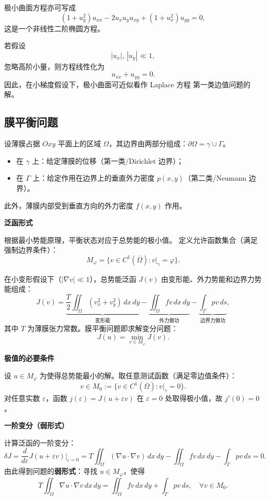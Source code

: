 \documentclass[12pt,a4paper]{ctexart}
\begin{document}
	极小曲面方程亦可写成
	\[
	(1+u_y^2)u_{xx}-2u_xu_yu_{xy}+(1+u_x^2)u_{yy}=0,
	\]
	这是一个非线性二阶椭圆方程。
	
	若假设
	\[
	|u_x|,\,|u_y|\ll1,
	\]
	忽略高阶小量，则方程线性化为
	\[
	u_{xx}+u_{yy}=0.
	\]
	因此，在小梯度假设下，极小曲面可近似看作 Laplace 方程
	第一类边值问题的解。
	
	\subsection{膜平衡问题}
	
	设薄膜占据 $Oxy$ 平面上的区域 $\Omega$，其边界由两部分组成：$\partial\Omega = \gamma \cup \Gamma$。
	
	\begin{itemize}
		\item 在 $\gamma$ 上：给定薄膜的位移（第一类/Dirichlet 边界）；
		\item 在 $\Gamma$ 上：给定作用在边界上的垂直外力密度 $p(x,y)$（第二类/Neumann 边界）。
	\end{itemize}
	此外，薄膜内部受到垂直方向的外力密度 $f(x,y)$ 作用。
	
	\medskip
	\textbf{泛函形式}
	
	根据最小势能原理，平衡状态对应于总势能的极小值。
	定义允许函数集合（满足强制边界条件）：
	\[
	M_\varphi = \{ v \in C^1(\overline{\Omega}) : v|_\gamma = \varphi \}.
	\]
	
	在小变形假设下（$|\nabla v| \ll 1$），总势能泛函 $J(v)$ 由变形能、外力势能和边界力势能组成：
	\[
	J(v) = \underbrace{\frac{T}{2} \iint_{\Omega} (v_x^2 + v_y^2) \,dx\,dy}_{\text{变形能}} 
	- \underbrace{\iint_{\Omega} f v \,dx\,dy}_{\text{外力做功}} 
	- \underbrace{\int_{\Gamma} p v \,ds}_{\text{边界力做功}},
	\]
	其中 $T$ 为薄膜张力常数。膜平衡问题即求解变分问题：
	\[
	J(u) = \min_{v \in M_\varphi} J(v).
	\]
	
	\medskip
	\textbf{极值的必要条件}
	
	设 $u \in M_\varphi$ 为使得总势能最小的解。取任意测试函数（满足零边值条件）：
	\[
	v \in M_0 := \{ v \in C^1(\overline{\Omega}) : v|_\gamma = 0 \}.
	\]
	对任意实数 $\varepsilon$，函数 $j(\varepsilon) = J(u + \varepsilon v)$ 在 $\varepsilon = 0$ 处取得极小值，故 $j'(0) = 0$。
	
	\medskip
	\textbf{一阶变分（弱形式）}
	
	计算泛函的一阶变分：
	\[
	\delta J = \frac{d}{d\varepsilon} J(u+\varepsilon v) \bigg|_{\varepsilon=0}
	= T \iint_{\Omega} (\nabla u \cdot \nabla v) \,dx\,dy - \iint_{\Omega} f v \,dx\,dy - \int_{\Gamma} p v \,ds = 0.
	\]
	由此得到问题的\textbf{弱形式}：寻找 $u \in M_\varphi$，使得
	\[
	T \iint_{\Omega} \nabla u \cdot \nabla v \,dx\,dy = \iint_{\Omega} f v \,dx\,dy + \int_{\Gamma} p v \,ds, \quad \forall v \in M_0.
	\]
	
\end{document}
